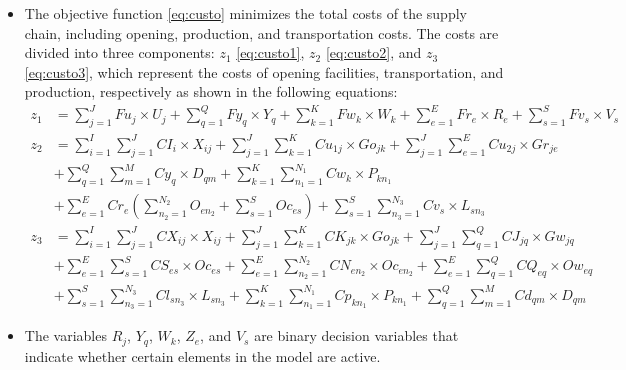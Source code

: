 \documentclass[sn-nature]{sn-jnl}%
\theoremstyle{thmstyleone}%
\theoremstyle{thmstyletwo}%
\theoremstyle{thmstylethree}%
\begin{document}
    
\begin{itemize}
    \item The objective function \eqref{eq:custo} minimizes the total costs of the supply chain, including opening, production, and transportation costs. The costs are divided into three components: 
    $z_1$ \eqref{eq:custo1}, $z_2$ \eqref{eq:custo2}, and $z_3$ \eqref{eq:custo3}, which represent the costs of opening facilities, transportation, and production, respectively as shown in the following equations:
    \begin{align}
        z_1 &= \sum\limits_{j=1}^J Fu_j\times U_j 
        + \sum\limits_{q=1}^Q Fy_q\times Y_q
        + \sum\limits_{k=1}^{K} Fw_k\times W_k
        + \sum\limits_{e=1}^{E} Fr_e\times R_e
        + \sum\limits_{s=1}^S Fv_s\times V_s \label{eq:custo1}\\
        z_2 &= \sum\limits_{i=1}^I\sum\limits_{j=1}^J CI_i\times X_{ij} 
        + \sum\limits_{j=1}^J\sum\limits_{k=1}^K Cu_{1j}\times Go_{jk}
        + \sum\limits_{j=1}^J\sum\limits_{e=1}^E Cu_{2j}\times Gr_{je} \nonumber \\
        &+ \sum\limits_{q=1}^Q\sum\limits_{m=1}^M Cy_{q}\times D_{qm} 
        + \sum\limits_{k=1}^K\sum\limits_{n_1=1}^{N_1} Cw_{k}\times P_{kn_1} \nonumber \\
        &+ \sum\limits_{e=1}^E Cr_e\left(\sum\limits_{n_2=1}^{N_2}O_{en_2} 
        + \sum\limits_{s=1}^S Oc_{es}\right)
        + \sum\limits_{s=1}^S\sum\limits_{n_3=1}^{N_3} Cv_{s}\times L_{sn_3} \label{eq:custo2}\\ 
        z_3 &= \sum\limits_{i=1}^I\sum\limits_{j=1}^J CX_{ij}\times X_{ij} 
        + \sum\limits_{j=1}^J\sum\limits_{k=1}^K CK_{jk}\times Go_{jk}
        + \sum\limits_{j=1}^J\sum\limits_{q=1}^Q CJ_{jq}\times Gw_{jq} \nonumber \\
        &+ \sum\limits_{e=1}^E\sum\limits_{s=1}^S CS_{es}\times Oc_{es} 
        + \sum\limits_{e=1}^E\sum\limits_{n_2=1}^{N_2} CN_{en_2}\times Oc_{en_2}
        + \sum\limits_{e=1}^E\sum\limits_{q=1}^Q CQ_{eq}\times Ow_{eq} \nonumber \\
        &+ \sum\limits_{s=1}^S\sum\limits_{n_3=1}^{N_3} Cl_{sn_3}\times L_{sn_3} 
        + \sum\limits_{k=1}^K\sum\limits_{n_1=1}^{N_1} Cp_{kn_1}\times P_{kn_1} 
        + \sum\limits_{q=1}^Q\sum\limits_{m=1}^M Cd_{qm}\times D_{qm} \label{eq:custo3}
    \end{align}
    \item The variables $R_j$, $Y_q$, $W_k$, $Z_e$, and $V_s$ are binary decision variables that indicate whether certain elements in the model are active. 

\end{itemize}
\end{document}
